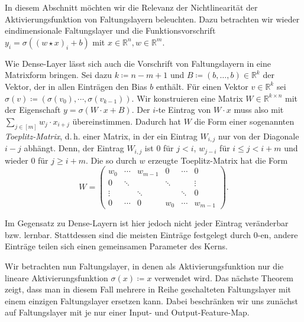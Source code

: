 \documentclass[paper=a4, 	%
		fontsize=11pt, 		%
		abstracton, 	%
		headsepline, 	%
		notitlepage	%
		]{scrartcl}
\theoremstyle{definition}
\newcommand{\R}{\mathbb{R}}
\newcommand{\todo}[1]{{\color{red} #1}}
\newcommand{\fNat}[1]{[ #1 ]}
\begin{document}
In diesem Abschnitt möchten wir die Relevanz der Nichtlinearität der Aktivierungsfunktion von Faltungslayern beleuchten.
Dazu betrachten wir wieder eindimensionale Faltungslayer und die Funktionsvorschrift $y_i = \sigma( (w\star x)_i + b )$ mit $x\in\R^n, w\in\R^m$.

Wie Dense-Layer lässt sich auch die Vorschrift von Faltungslayern in eine Matrixform bringen.
Sei dazu $k\coloneqq n-m+1$ und $B\coloneqq (b, \dots, b)\in\R^k$ der Vektor, der in allen Einträgen den Bias $b$ enthält.
Für einen Vektor $v\in\R^k$ sei $\sigma(v) \coloneqq (\sigma(v_0), \cdots, \sigma(v_{k-1}))$.
Wir konstruieren eine Matrix $W\in\R^{k\times n}$ mit der Eigenschaft $y = \sigma( W\cdot x + B )$.
Der $i$-te Eintrag von $W\cdot x$ muss also mit $\sum_{j\in\fNat{m}} w_j \cdot x_{i+j}$
übereinstimmen.
Dadurch hat $W$ die Form einer sogenannten \emph{Toeplitz-Matrix}, d.\,h. einer Matrix, in der ein Eintrag $W_{i,j}$ nur von der Diagonale $i-j$ abhängt.
Denn, der Eintrag $W_{i,j}$ ist $0$ für $j < i$, $w_{j-i}$ für $i \leq j < i+m$ und wieder $0$ für $j \geq i+m$.
Die so durch $w$ erzeugte Toeplitz-Matrix hat die Form
\[
    W = \begin{pmatrix}
            w_0 & \cdots & w_{m-1} & 0 & \cdots & 0 \\
            0 & \ddots & & \ddots  & & \vdots \\
            \vdots  & & \ddots & & \ddots & 0 \\[4pt]
             0 & \cdots & 0 & w_0 & \cdots & w_{m-1}
        \end{pmatrix}.
\]

Im Gegensatz zu Dense-Layern ist hier jedoch nicht jeder Eintrag veränderbar bzw. lernbar.
Stattdessen sind die meisten Einträge festgelegt durch $0$-en, andere Einträge teilen sich einen gemeinsamen Parameter des Kerns.

Wir betrachten nun Faltungslayer, in denen als Aktivierungsfunktion nur die lineare Aktivierungsfunktion $\sigma(x) \coloneqq x$ verwendet wird.
Das nächste Theorem zeigt, dass man in diesem Fall mehrere in Reihe geschalteten Faltungslayer mit einem einzigen Faltungslayer ersetzen kann.
Dabei \todo{beschränken wir uns zunächst auf Faltungslayer mit je nur einer Input- und Output-Feature-Map.}
\end{document}
